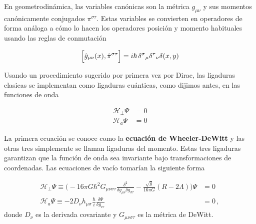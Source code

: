 \documentclass[11pt,a4paper,titlepage]{article}
\begin{document}
En geometrodinámica, las variables canónicas son la métrica $g_{\mu\nu}$ y sus momentos canónicamente conjugados $\pi^{\sigma\tau}$. Estas variables se convierten en operadores de forma análoga a cómo lo hacen los operadores posición y momento habituales usando las reglas de conmutación

\begin{equation*}
 \Big[\hat{g}_{\mu\nu}(x),\hat{\pi}^{\sigma\tau}\Big]=i\hbar\,\tensor{\delta}{^\sigma}{_\mu}\tensor{\delta}{^\tau}{_\nu}\delta(x,y)
\end{equation*}

Usando un procedimiento sugerido por primera vez por Dirac, las ligaduras clasicas se implementan como ligaduras cuánticas, como dijimos antes, en las funciones de onda

\begin{align*}
 \mathscr{H}_\perp\Psi&=0\\
 \mathscr{H}_a\Psi&=0
\end{align*}

La primera ecuación se conoce como la \textbf{ecuación de Wheeler-DeWitt} y las otras tres simplemente se llaman ligaduras del momento. Estas tres ligaduras garantizan que la función de onda sea invariante bajo transformaciones de coordenadas. Las ecuaciones de vacío tomarían la siguiente forma

\begin{align*}
  \mathscr{H}_\perp\Psi\equiv\Big(-16\pi G\hbar^2G_{\mu\nu\sigma\tau}\frac{\delta^2}{\delta g_{\mu\nu}\delta g_{\sigma\tau}}-\frac{\sqrt{g}}{16\pi G}(R-2\Lambda)\Big)\Psi&=0\\
 \mathscr{H}_a\Psi\equiv-2D_\nu h_{\mu\sigma}\frac{\hbar}{i}\frac{\delta\Psi}{\delta g_{\nu\tau}}&=0\,,
\end{align*}
donde $D_\nu$ es la derivada covariante y $G_{\mu\nu\sigma\tau}$ es la métrica de DeWitt.
\end{document}
